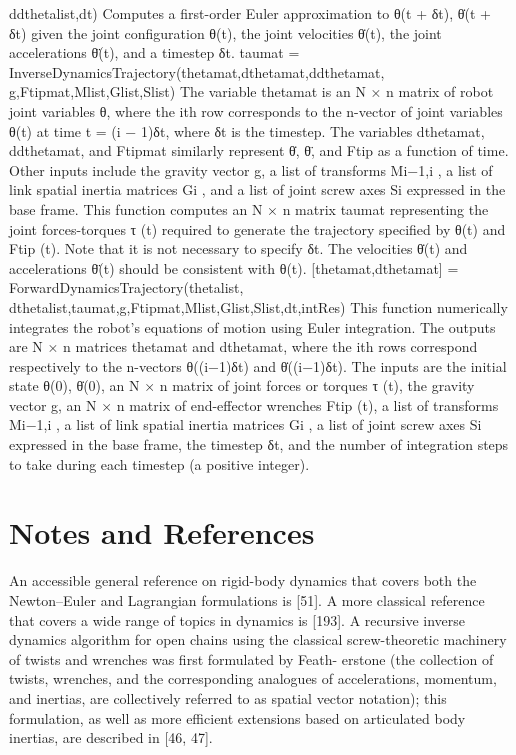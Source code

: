 \documentclass[12pt,a4paper]{article}
\begin{document}
ddthetalist,dt)
Computes a first-order Euler approximation to {θ(t + δt), θ̇(t + δt)} given the
joint configuration θ(t), the joint velocities θ̇(t), the joint accelerations θ̈(t), and
a timestep δt.
taumat = InverseDynamicsTrajectory(thetamat,dthetamat,ddthetamat,
g,Ftipmat,Mlist,Glist,Slist)
The variable thetamat is an N × n matrix of robot joint variables θ, where the
ith row corresponds to the n-vector of joint variables θ(t) at time t = (i − 1)δt,
where δt is the timestep. The variables dthetamat, ddthetamat, and Ftipmat
similarly represent θ̇, θ̈, and Ftip as a function of time. Other inputs include the
gravity vector g, a list of transforms Mi−1,i , a list of link spatial inertia matrices
Gi , and a list of joint screw axes Si expressed in the base frame. This function
computes an N × n matrix taumat representing the joint forces-torques τ (t)
required to generate the trajectory specified by θ(t) and Ftip (t). Note that it is
not necessary to specify δt. The velocities θ̇(t) and accelerations θ̈(t) should be
consistent with θ(t).
[thetamat,dthetamat] = ForwardDynamicsTrajectory(thetalist,
dthetalist,taumat,g,Ftipmat,Mlist,Glist,Slist,dt,intRes)
This function numerically integrates the robot’s equations of motion using Euler
integration. The outputs are N × n matrices thetamat and dthetamat, where
the ith rows correspond respectively to the n-vectors θ((i−1)δt) and θ̇((i−1)δt).
The inputs are the initial state θ(0), θ̇(0), an N × n matrix of joint forces or
torques τ (t), the gravity vector g, an N × n matrix of end-effector wrenches
Ftip (t), a list of transforms Mi−1,i , a list of link spatial inertia matrices Gi , a
list of joint screw axes Si expressed in the base frame, the timestep δt, and the
number of integration steps to take during each timestep (a positive integer).

\section{Notes and References}
An accessible general reference on rigid-body dynamics that covers both the
Newton–Euler and Lagrangian formulations is [51]. A more classical reference
that covers a wide range of topics in dynamics is [193].
    A recursive inverse dynamics algorithm for open chains using the classical
screw-theoretic machinery of twists and wrenches was first formulated by Feath-
erstone (the collection of twists, wrenches, and the corresponding analogues of
accelerations, momentum, and inertias, are collectively referred to as spatial
vector notation); this formulation, as well as more efficient extensions based on
articulated body inertias, are described in [46, 47].
\end{document}
